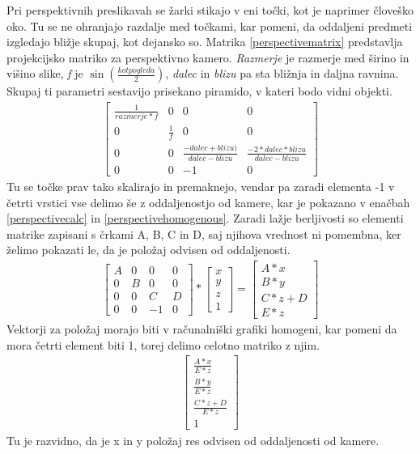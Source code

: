 \documentclass[a4paper, 12pt]{book}
\begin{document}
Pri perspektivnih preslikavah se žarki stikajo v eni točki, kot je naprimer človeško oko. Tu se ne ohranjajo razdalje med točkami, kar pomeni, da oddaljeni predmeti izgledajo bližje skupaj, kot dejansko so. Matrika \ref{perspectivematrix} predstavlja projekcijsko matriko za perspektivno kamero. \emph{Razmerje} je razmerje med širino in višino slike, \emph{f} je $\sin (\frac{kot pogleda}{2})$, \emph{dalec} in \emph{blizu} pa sta bližnja in daljna ravnina. Skupaj ti parametri sestavijo prisekano piramido, v kateri bodo vidni objekti.
\begin{align}
\begin{bmatrix}
\frac{1}{razmerje*f} & 0 & 0 & 0 \\ 
0 & \frac{1}{f} & 0 & 0 \\ 
0 & 0 & \frac{-dalec+blizu)}{dalec-blizu} & \frac{-2*dalec*blizu}{dalec-blizu} \\ 
0 & 0 & -1 & 0
\end{bmatrix}
\label{perspectivematrix}
\end{align}
Tu se točke prav tako skalirajo in premaknejo, vendar pa zaradi elementa -1 v četrti vrstici vse delimo še z oddaljenostjo od kamere, kar je pokazano v enačbah \ref{perspectivecalc} in \ref{perspectivehomogenous}. Zaradi lažje berljivosti so elementi matrike zapisani s črkami A, B, C in D, saj njihova vrednost ni pomembna, ker želimo pokazati le, da je položaj odvisen od oddaljenosti.
\begin{align}
\begin{bmatrix}
A & 0 & 0 & 0 \\ 
0 & B & 0 & 0 \\ 
0 & 0 & C & D \\ 
0 & 0 & -1 & 0
\end{bmatrix}
*
\begin{bmatrix}
x \\ y \\ z \\ 1
\end{bmatrix}	
=
\begin{bmatrix}
A*x \\
B*y \\
C*z+D \\
E*z
\end{bmatrix}
\label{perspectivecalc}
\end{align}
Vektorji za položaj morajo biti v računalniški grafiki homogeni, kar pomeni da mora četrti element biti 1, torej delimo celotno matriko z njim.
\begin{align}
\begin{bmatrix}
\frac{A*x}{E*z} \\ 
\frac{B*y}{E*z} \\
\frac{C*z+D}{E*z} \\
1
\end{bmatrix}
\label{perspectivehomogenous}
\end{align}
Tu je razvidno, da je x in y položaj res odvisen od oddaljenosti od kamere.
\end{document}
